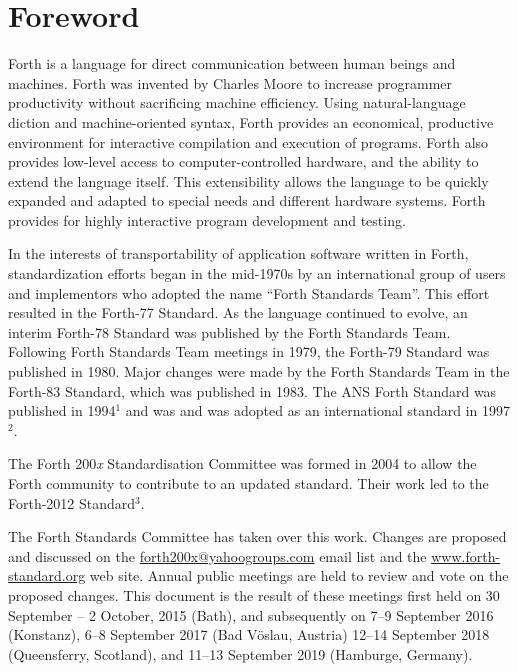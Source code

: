 
\vspace*{-6ex}\chapter*{Foreword}
\label{foreword}

Forth is a language for direct communication between human beings and
machines. Forth was invented by Charles Moore to increase programmer
productivity without sacrificing machine efficiency.
Using natural-language diction and machine-oriented syntax,
Forth provides an economical, productive environment for interactive
compilation and execution of programs. Forth also provides low-level
access to computer-controlled hardware, and the ability to extend the
language itself. This extensibility allows the language to be quickly
expanded and adapted to special needs and different hardware systems.
Forth provides for highly interactive program development and testing.

In the interests of transportability of application software written in
Forth, standardization efforts began in the mid-1970s by an international
group of users and implementors who adopted the name ``Forth Standards Team''.
This effort resulted in the Forth-77 Standard. As the language continued
to evolve, an interim Forth-78 Standard was published by the Forth Standards
Team. Following Forth Standards Team meetings in 1979, the Forth-79 Standard
was published in 1980. Major changes were made by the Forth Standards Team
in the Forth-83 Standard, which was published in 1983.
The ANS Forth Standard was published in 1994$^1$ and was
and was adopted as an international standard in 1997$^2$.





The Forth 200\emph{x} Standardisation Committee was formed in 2004
to allow the Forth community to contribute to an updated standard.
Their work led to the Forth-2012 Standard$^3$.

The Forth Standards Committee has taken over this work.  
Changes are proposed and discussed on the
\href{email:forth200x@yahoogroups.com}{forth200x@yahoogroups.com}
email list and the \href{href://www.forth-standard.org/}{www.forth-standard.org}
web site.
Annual public meetings are held to review and vote on the proposed changes.
This document is the result of these meetings first held on
30 September -- 2 October, 2015 (Bath), and subsequently on
7--9 September 2016 (Konstanz),
6--8 September 2017 (Bad V\"oslau, Austria)
12--14 September 2018 (Queensferry, Scotland),
and 
11--13 September 2019 (Hamburge, Germany).
